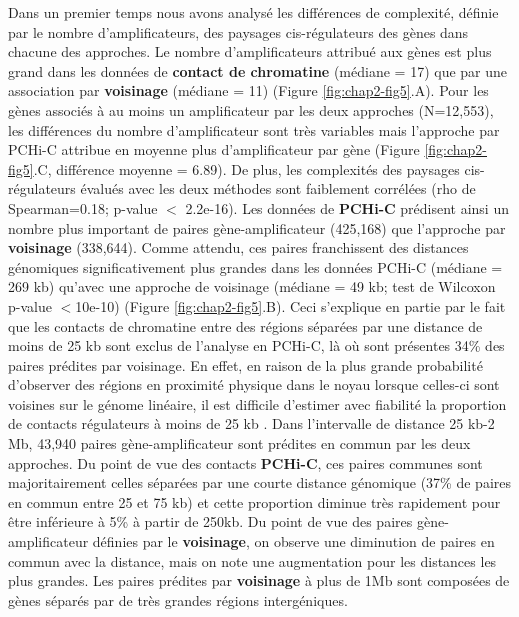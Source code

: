 Dans un premier temps nous avons analysé les différences de complexité, définie par le nombre d’amplificateurs, des paysages \gls{cis}-régulateurs des gènes dans chacune des approches. Le nombre d’\glspl{amplificateur} attribué aux gènes est plus grand dans les données de \textbf{contact de chromatine} (médiane = 17) que par une association par \textbf{voisinage} (médiane = 11) (Figure \ref{fig:chap2-fig5}.A). Pour les gènes associés à au moins un \gls{amplificateur} par les deux approches (N=12,553), les différences du nombre d’\gls{amplificateur} sont très variables mais l’approche par \gls{PCHi-C} attribue en moyenne plus d’\gls{amplificateur} par gène (Figure \ref{fig:chap2-fig5}.C, différence moyenne = 6.89). De plus, les complexités des paysages \gls{cis}-régulateurs évalués avec les deux méthodes sont faiblement corrélées (rho de Spearman=0.18; p-value $<$ 2.2e-16). Les données de \textbf{\gls{PCHi-C}} prédisent ainsi un nombre plus important de paires gène-\gls{amplificateur} (425,168) que l’approche par \textbf{voisinage} (338,644). Comme attendu, ces paires franchissent des distances génomiques significativement plus grandes dans les données \gls{PCHi-C} (médiane = 269 kb) qu’avec une approche de voisinage (médiane = 49 kb; test de Wilcoxon p-value $<$10e-10) (Figure \ref{fig:chap2-fig5}.B). Ceci s’explique en partie par le fait que les contacts de chromatine entre des régions séparées par une distance de moins de 25 kb sont exclus de l’analyse en \gls{PCHi-C}, là où sont présentes 34\% des paires prédites par voisinage. En effet, en raison de la plus grande probabilité d’observer des régions en proximité physique dans le noyau lorsque celles-ci sont voisines sur le génome linéaire, il est difficile d’estimer avec fiabilité la proportion de contacts régulateurs à moins de 25 kb \citep{cairns_chicago_2016}. Dans l’intervalle de distance 25 kb-2 Mb, 43,940 paires gène-\gls{amplificateur} sont prédites en commun par les deux approches. Du point de vue des contacts \textbf{\gls{PCHi-C}}, ces paires communes sont majoritairement celles séparées par une courte distance génomique (37\% de paires en commun entre 25 et 75 kb) et cette proportion diminue très rapidement pour être inférieure à 5\% à partir de 250kb. Du point de vue des paires gène-\gls{amplificateur} définies par le \textbf{voisinage}, on observe une diminution de paires en commun avec la distance, mais on note une augmentation pour les distances les plus grandes. Les paires prédites par \textbf{voisinage} à plus de 1Mb sont composées de gènes séparés par de très grandes régions intergéniques.\\

